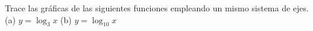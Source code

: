 \item Trace las gráficas de las siguientes funciones empleando un mismo sistema de ejes.\\
(a) $y = \log_3 x$ \qquad (b) $y = \log_{10} x$
